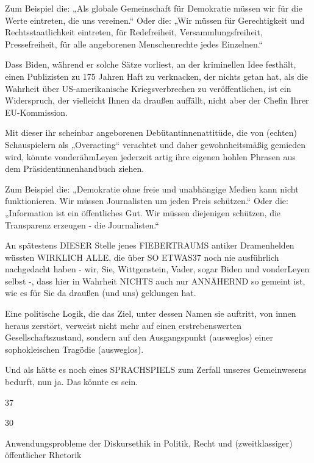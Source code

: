 \begin{multicols}{2}
Zum Beispiel die: „Als globale Gemeinschaft für Demokratie müssen wir für die Werte eintreten, die uns vereinen.“ Oder die: „Wir müssen für Gerechtigkeit und
Rechtsstaatlichkeit eintreten, für Redefreiheit, Versammlungsfreiheit, Pressefreiheit, für alle angeborenen Menschenrechte jedes Einzelnen.“

Dass Biden, während er solche Sätze vorliest, an der kriminellen Idee festhält, einen Publizisten zu 175 Jahren
Haft zu verknacken, der nichts getan hat, als die Wahrheit über US-amerikanische Kriegsverbrechen zu veröffentlichen, ist ein Widerspruch, der vielleicht Ihnen da
draußen auffällt, nicht aber der Chefin Ihrer EU-Kommission.

Mit dieser ihr scheinbar angeborenen Debütantinnenattitüde, die von (echten) Schauspielern als „Overacting“
verachtet und daher gewohnheitsmäßig gemieden wird,
könnte vonderähmLeyen jederzeit artig ihre eigenen
hohlen Phrasen aus dem Präsidentinnenhandbuch ziehen.

Zum Beispiel die: „Demokratie ohne freie und unabhängige Medien kann nicht funktionieren. Wir müssen Journalisten um jeden Preis schützen.“ Oder die: „Information
ist ein öffentliches Gut. Wir müssen diejenigen schützen,
die Transparenz erzeugen - die Journalisten.“

An spätestens DIESER Stelle jenes FIEBERTRAUMS antiker Dramenhelden wüssten WIRKLICH ALLE, die über
SO ETWAS37 noch nie ausführlich nachgedacht haben
- wir, Sie, Wittgenstein, Vader, sogar Biden und vonderLeyen selbst -, dass hier in Wahrheit NICHTS auch nur
ANNÄHERND so gemeint ist, wie es für Sie da draußen
(und uns) geklungen hat.

Eine politische Logik, die das Ziel, unter dessen Namen
sie auftritt, von innen heraus zerstört, verweist nicht
mehr auf einen erstrebenswerten Gesellschaftszustand,
sondern auf den Ausgangspunkt (ausweglos) einer sophokleischen Tragödie (ausweglos).

Und als hätte es noch eines SPRACHSPIELS zum Zerfall
unseres Gemeinwesens bedurft, nun ja. Das könnte es
sein.

37

30

Anwendungsprobleme der Diskursethik in Politik, Recht und (zweitklassiger) öffentlicher Rhetorik


\end{multicols}
\newpage
\pagecolor{assangered}\afterpage{\nopagecolor}
